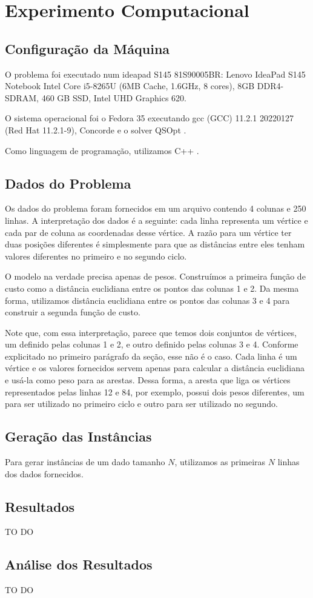 \documentclass{article}
\begin{document}
\section{Experimento Computacional}

\subsection{Configuração da Máquina}

O problema foi executado num ideapad S145 81S90005BR: Lenovo IdeaPad S145 Notebook Intel Core i5-8265U (6MB Cache, 1.6GHz, 8 cores), 8GB DDR4-SDRAM, 460 GB SSD, Intel UHD Graphics 620.

O sistema operacional foi o Fedora 35 executando gcc (GCC) 11.2.1 20220127 (Red Hat 11.2.1-9), Concorde \cite{bib:concorde} e o solver QSOpt \cite{bib:qsopt}.

Como linguagem de programação, utilizamos C++ \cite{bib:cpp}.


\subsection{Dados do Problema}

Os dados do problema foram fornecidos em um arquivo contendo 4 colunas e 250 linhas. A interpretação dos dados é a seguinte: cada linha representa um vértice e cada par de coluna as coordenadas desse vértice. A razão para um vértice ter duas posições diferentes é simplesmente para que as distâncias entre eles tenham valores diferentes no primeiro e no segundo ciclo.

O modelo na verdade precisa apenas de pesos. Construímos a primeira função de custo como a distância euclidiana entre os pontos das colunas 1 e 2. Da mesma forma, utilizamos distância euclidiana entre os pontos das colunas 3 e 4 para construir a segunda função de custo.

Note que, com essa interpretação, parece que temos dois conjuntos de vértices, um definido pelas colunas 1 e 2, e outro definido pelas colunas 3 e 4. Conforme explicitado no primeiro parágrafo da seção, esse não é o caso. Cada linha é um vértice e os valores fornecidos servem apenas para calcular a distância euclidiana e usá-la como peso para as arestas. Dessa forma, a aresta que liga os vértices representados pelas linhas 12 e 84, por exemplo, possui dois pesos diferentes, um para ser utilizado no primeiro ciclo e outro para ser utilizado no segundo.

\subsection{Geração das Instâncias}

Para gerar instâncias de um dado tamanho $N$, utilizamos as primeiras $N$ linhas dos dados fornecidos.

\subsection{Resultados}

{\huge TO DO}

\subsection{Análise dos Resultados}

{\huge TO DO}



\end{document}
